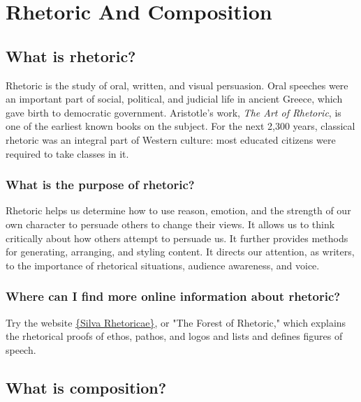 
\chapter{Rhetoric And Composition}


\section{What is rhetoric?}

Rhetoric is the study of oral, written, and visual persuasion. Oral speeches were an 
important part of social, political, and judicial life in ancient Greece, which gave birth 
to democratic government. Aristotle's work, \emph{The Art of Rhetoric}, is one of the 
earliest known books on the subject. For the next 2,300 years, classical rhetoric was an 
integral part of Western culture: most educated citizens were required to take classes 
in it.

\subsection{What is the purpose of rhetoric?}

Rhetoric helps us determine how to use reason, emotion, and the strength of our own 
character to persuade others to change their views. It allows us to think critically about 
how others attempt to persuade us. It further provides methods for generating, 
arranging, and styling content. It directs our attention, as writers, to the importance 
of rhetorical situations, audience awareness, and voice.

\subsection{Where can I find more online information about rhetoric?}

Try the website \href{http://rhetoric.byu.edu} {\{Silva Rhetoricae\}}, or "The Forest of 
Rhetoric," which explains the rhetorical proofs of ethos, pathos, and logos and lists and 
defines figures of speech.


\section{What is composition?}

